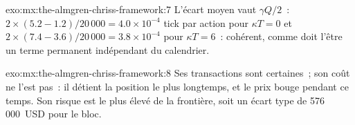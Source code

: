 \begin{solution}{exo:mx:the-almgren-chriss-framework:7}
L'écart moyen vaut $\gamma Q/2$~: $2\times(5.2-1.2)/20\,000=4.0\times10^{-4}$ tick par action pour $\kappa T=0$ et $2\times(7.4-3.6)/20\,000=3.8\times10^{-4}$ pour
$\kappa T=6$~: cohérent, comme doit l'être un terme permanent indépendant du calendrier.
\end{solution}

\begin{solution}{exo:mx:the-almgren-chriss-framework:8}
Ses transactions sont certaines~; son coût ne l'est pas~: il détient la position le plus longtemps, et le prix bouge pendant ce temps. Son risque est le plus élevé de la frontière,
soit un écart type de 576\,000~USD pour le bloc.
\end{solution}

